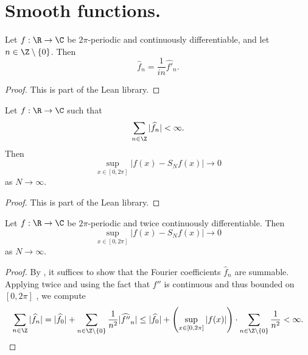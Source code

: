 \section{Smooth functions.}
\label{10smooth}
\begin{lemma}
\label{fourier-coeff-derivative}
\leanok
{}
Let $f:\R \to \C$ be $2\pi$-periodic and continuously differentiable, and let $n \in \Z \setminus \{0\}$. Then
\begin{equation}
    \widehat{f}_n = \frac{1}{i n} \widehat{f'}_n.
\end{equation}
\end{lemma}
\begin{proof}
\leanok
This is part of the Lean library.
\end{proof}

\begin{lemma}
\label{convergence-of-coeffs-summable}
\leanok
{}
Let $f:\R \to \C$ such that
\begin{equation}
    \sum_{n\in \Z} |\widehat{f}_n| < \infty.
\end{equation}
Then
\begin{equation}
    \sup_{x\in [0,2\pi]} |f(x) - S_Nf(x)| \rightarrow 0
\end{equation}
as $N \rightarrow \infty$.
\end{lemma}

\begin{proof}
\leanok
    This is part of the Lean library.
\end{proof}

\begin{lemma}
\label{convergence-for-twice-contdiff}
\leanok
{}
    Let $f:\R \to \C$ be $2\pi$-periodic and twice continuously differentiable. Then
    \begin{equation}
        \sup_{x\in [0,2\pi]} |f(x) - S_Nf(x)| \rightarrow 0
    \end{equation}
    as $N \rightarrow \infty$.
\end{lemma}
\begin{proof}
\leanok
By , it suffices to show that the Fourier coefficients $\widehat{f}_n$ are summable.
Applying  twice and using the fact that $f''$ is continuous and thus bounded on $[0,2\pi]$ , we compute
\begin{equation*}
    \sum_{n\in \Z} |\widehat{f}_n| = |\widehat{f}_0| + \sum_{n\in \Z \setminus \{0\}} \frac {1}{n^2} |\widehat{f''}_n|
    \le |\widehat{f}_0| + \left(\sup_{x\in [0,2\pi]} |f(x)| \right) \cdot \sum_{n\in \Z \setminus \{0\}} \frac {1}{n^2}
    < \infty.
\end{equation*}
\end{proof}

